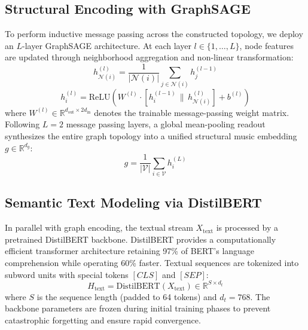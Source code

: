 \documentclass{article}
\begin{document}
\subsection{Structural Encoding with GraphSAGE}
To perform inductive message passing across the constructed topology, we deploy an $L$-layer GraphSAGE architecture. At each layer $l \in \{1, \dots, L\}$, node features are updated through neighborhood aggregation and non-linear transformation:
\begin{equation}
h_{\mathcal{N}(i)}^{(l)} = \frac{1}{|\mathcal{N}(i)|} \sum_{j \in \mathcal{N}(i)} h_j^{(l-1)}
\end{equation}
\begin{equation}
h_i^{(l)} = \text{ReLU}\left( W^{(l)} \cdot \left[ h_i^{(l-1)} \,\|\, h_{\mathcal{N}(i)}^{(l)} \right] + b^{(l)} \right)
\end{equation}
where $W^{(l)} \in \mathbb{R}^{d_{\text{out}} \times 2d_{\text{in}}}$ denotes the trainable message-passing weight matrix. Following $L=2$ message passing layers, a global mean-pooling readout synthesizes the entire graph topology into a unified structural music embedding $g \in \mathbb{R}^{d_g}$:
\begin{equation}
g = \frac{1}{|\mathcal{V}|} \sum_{i \in \mathcal{V}} h_i^{(L)}
\end{equation}

\subsection{Semantic Text Modeling via DistilBERT}
In parallel with graph encoding, the textual stream $X_{\text{text}}$ is processed by a pretrained DistilBERT backbone. DistilBERT provides a computationally efficient transformer architecture retaining 97\% of BERT's language comprehension while operating 60\% faster. Textual sequences are tokenized into subword units with special tokens $[CLS]$ and $[SEP]$:
\begin{equation}
H_{\text{text}} = \text{DistilBERT}(X_{\text{text}}) \in \mathbb{R}^{S \times d_t}
\end{equation}
where $S$ is the sequence length (padded to 64 tokens) and $d_t = 768$. The backbone parameters are frozen during initial training phases to prevent catastrophic forgetting and ensure rapid convergence.
\end{document}
